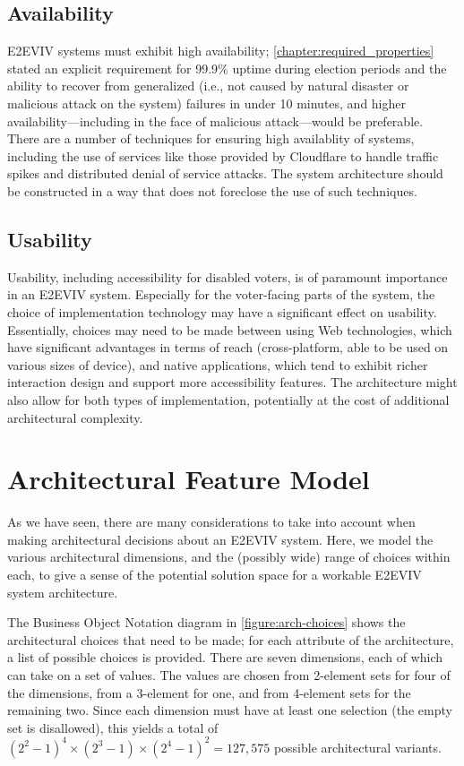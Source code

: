 \subsection{Availability}

E2EVIV systems must exhibit high availability;
\autoref{chapter:required_properties} stated an explicit requirement
for 99.9\% uptime during election periods and the ability to recover
from generalized (i.e., not caused by natural disaster or malicious
attack on the system) failures in under 10 minutes, and higher
availability---including in the face of malicious attack---would be
preferable. There are a number of techniques for ensuring high
availablity of systems, including the use of services like those
provided by Cloudflare to handle traffic spikes and distributed denial
of service attacks. The system architecture should be constructed in a
way that does not foreclose the use of such techniques.

\subsection{Usability}

Usability, including accessibility for disabled voters, is of
paramount importance in an E2EVIV system. Especially for the
voter-facing parts of the system, the choice of implementation
technology may have a significant effect on usability. Essentially,
choices may need to be made between using Web technologies, which have
significant advantages in terms of reach (cross-platform, able to be
used on various sizes of device), and native applications, which tend
to exhibit richer interaction design and support more accessibility
features. The architecture might also allow for both types of
implementation, potentially at the cost of additional architectural
complexity.

\section{Architectural Feature Model}

As we have seen, there are many considerations to take into account
when making architectural decisions about an E2EVIV system. Here, we
model the various architectural dimensions, and the (possibly wide)
range of choices within each, to give a sense of the potential
solution space for a workable E2EVIV system architecture.

The Business Object Notation diagram in \autoref{figure:arch-choices}
shows the architectural choices that need to be made; for each
attribute of the architecture, a list of possible choices is
provided. There are seven dimensions, each of which can take on a set
of values. The values are chosen from 2-element sets for four of the
dimensions, from a 3-element for one, and from 4-element sets for the
remaining two. Since each dimension must have at least one selection
(the empty set is disallowed), this yields a total of
$(2^2-1)^4\times(2^3-1)\times(2^4-1)^2=127,\!575$ possible
architectural variants.

